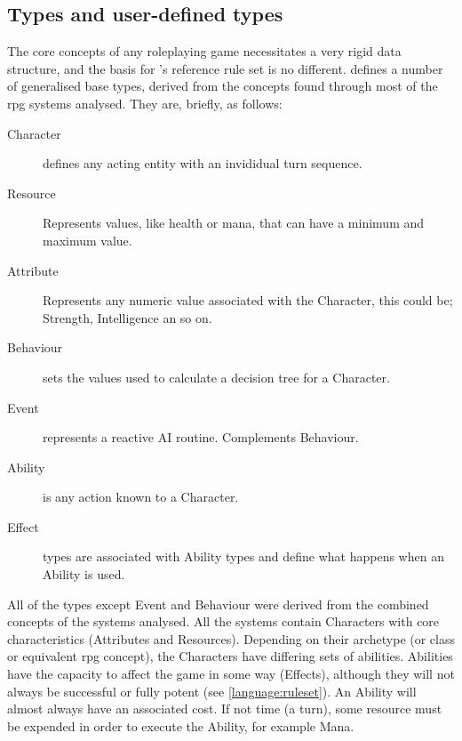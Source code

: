 \subsection{Types and user-defined types}
\label{language:types}
The core concepts of any roleplaying game necessitates a very rigid data structure, and the basis for \langname{}'s reference rule set is no different.
\langname{} defines a number of generalised base types, derived from the concepts found through most of the \ac{rpg} systems analysed. They are, briefly, as follows:
\begin{description}
	\item[Character] defines any acting entity with an invididual turn sequence.
	\item[Resource] Represents values, like health or mana, that can have a minimum and maximum value.
	\item[Attribute] Represents any numeric value associated with the Character, this could be; Strength, Intelligence an so on.
	\item[Behaviour] sets the values used to calculate a decision tree for a Character.
	\item[Event] represents a reactive AI routine. Complements Behaviour.
	\item[Ability] is any action known to a Character.
	\item[Effect] types are associated with Ability types and define what happens when an Ability is used.
\end{description} 

All of the types except Event and Behaviour were derived from the combined concepts of the systems analysed. All the systems contain Characters with core characteristics (Attributes and Resources). Depending on their archetype (or class or equivalent \ac{rpg} concept), the Characters have differing sets of abilities.
Abilities have the capacity to affect the game in some way (Effects), although they will not always be successful or fully potent (see \vref{language:ruleset}). An Ability will almost always have an associated cost. If not time (a turn), some resource must be expended in order to execute the Ability, for example Mana. %

